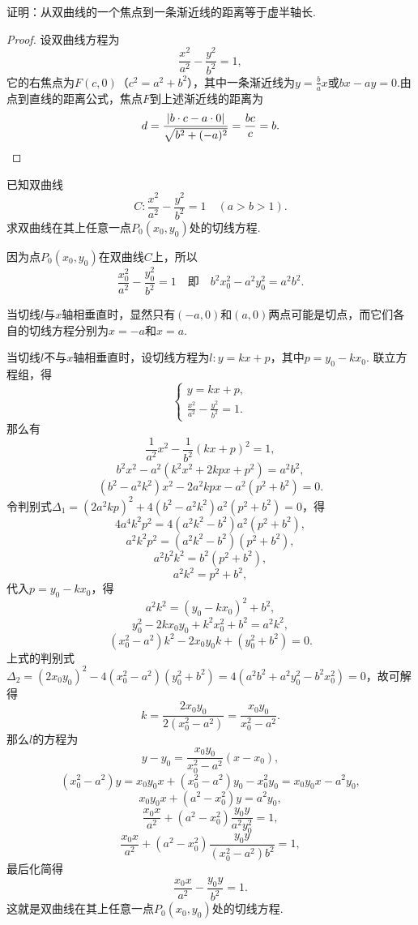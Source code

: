 \begin{example}
证明：从双曲线的一个焦点到一条渐近线的距离等于虚半轴长.
\begin{proof}
设双曲线方程为\[
\frac{x^2}{a^2}-\frac{y^2}{b^2}=1,
\]它的右焦点为\(F(c,0)\)（\(c^2=a^2+b^2\)），其中一条渐近线为\(y=\frac{b}{a}x\)或\(bx-ay=0\).由点到直线的距离公式，焦点\(F\)到上述渐近线的距离为\[
d = \frac{\abs{b \cdot c - a \cdot 0}}{\sqrt{b^2+(-a)^2}}
= \frac{bc}{c} = b.
\qedhere
\]
\end{proof}
\end{example}

\begin{example}
已知双曲线\[
C: \frac{x^2}{a^2} - \frac{y^2}{b^2} = 1 \quad(a>b>1).
\]求双曲线在其上任意一点\(P_0(x_0,y_0)\)处的切线方程.
\begin{solution}
因为点\(P_0(x_0,y_0)\)在双曲线\(C\)上，所以\[
\frac{x_0^2}{a^2} - \frac{y_0^2}{b^2} = 1
\quad\text{即}\quad
b^2 x_0^2 - a^2 y_0^2 = a^2 b^2.
\]

当切线\(l\)与\(x\)轴相垂直时，显然只有\((-a,0)\)和\((a,0)\)两点可能是切点，而它们各自的切线方程分别为\(x=-a\)和\(x=a\).

当切线\(l\)不与\(x\)轴相垂直时，设切线方程为\(l: y = kx + p\)，其中\(p = y_0 - k x_0\).
联立方程组，得\[
\begin{cases}
y = kx + p, \\
\frac{x^2}{a^2} - \frac{y^2}{b^2} = 1.
\end{cases}
\]那么有\[
\frac{1}{a^2} x^2 - \frac{1}{b^2} (kx+p)^2 = 1,
\]\[
b^2 x^2 - a^2 (k^2 x^2 + 2kpx + p^2) = a^2 b^2,
\]\[
(b^2 - a^2 k^2) x^2 - 2 a^2 k p x - a^2 (p^2 + b^2) = 0.
\]令判别式\(\Delta_1 = (2 a^2 k p)^2 + 4 (b^2 - a^2 k^2) a^2 (p^2 + b^2) = 0\)，得\[
4 a^4 k^2 p^2 = 4 (a^2 k^2 - b^2) a^2 (p^2 + b^2),
\]\[
a^2 k^2 p^2 = (a^2 k^2 - b^2)(p^2 + b^2),
\]\[
a^2 b^2 k^2 = b^2(p^2 + b^2),
\]\[
a^2 k^2 = p^2 + b^2,
\]
代入\(p = y_0 - k x_0\)，得\[
a^2 k^2 = (y_0 - k x_0)^2 + b^2,
\]\[
y_0^2 - 2k x_0 y_0 + k^2 x_0^2 + b^2 = a^2 k^2,
\]\[
(x_0^2 - a^2) k^2 - 2 x_0 y_0 k + (y_0^2 + b^2) = 0.
\]上式的判别式\(\Delta_2 = (2 x_0 y_0)^2 - 4(x_0^2 - a^2)(y_0^2 + b^2)
= 4(a^2 b^2 + a^2 y_0^2 - b^2 x_0^2) = 0\)，故可解得\[
k = \frac{2 x_0 y_0}{2 (x_0^2 - a^2)}
= \frac{x_0 y_0}{x_0^2 - a^2}.
\]那么\(l\)的方程为\[
y - y_0 = \frac{x_0 y_0}{x_0^2 - a^2} (x - x_0),
\]\[
(x_0^2 - a^2) y = x_0 y_0 x + (x_0^2 - a^2) y_0 - x_0^2 y_0
= x_0 y_0 x - a^2 y_0,
\]\[
x_0 y_0 x + (a^2 - x_0^2) y = a^2 y_0,
\]\[
\frac{x_0 x}{a^2} + (a^2 - x_0^2) \frac{y_0 y}{a^2 y_0^2} = 1,
\]\[
\frac{x_0 x}{a^2} + (a^2 - x_0^2) \frac{y_0 y}{(x_0^2 - a^2) b^2} = 1,
\]最后化简得\begin{equation}\label{equation:解析几何.双曲线的切线}
\frac{x_0 x}{a^2} - \frac{y_0 y}{b^2} = 1.
\end{equation}
这就是双曲线在其上任意一点\(P_0(x_0,y_0)\)处的切线方程.
\end{solution}
\end{example}

